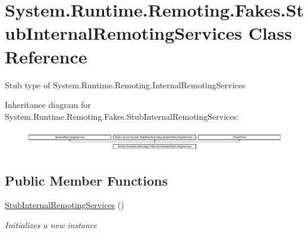 \hypertarget{class_system_1_1_runtime_1_1_remoting_1_1_fakes_1_1_stub_internal_remoting_services}{\section{System.\-Runtime.\-Remoting.\-Fakes.\-Stub\-Internal\-Remoting\-Services Class Reference}
\label{class_system_1_1_runtime_1_1_remoting_1_1_fakes_1_1_stub_internal_remoting_services}
}


Stub type of System.\-Runtime.\-Remoting.\-Internal\-Remoting\-Services 


Inheritance diagram for System.\-Runtime.\-Remoting.\-Fakes.\-Stub\-Internal\-Remoting\-Services\-:\begin{figure}[H]
\begin{center}
\leavevmode
\includegraphics[height=0.933333cm]{class_system_1_1_runtime_1_1_remoting_1_1_fakes_1_1_stub_internal_remoting_services}
\end{center}
\end{figure}
\subsection*{Public Member Functions}
\begin{DoxyCompactItemize}
\item 
\hyperlink{class_system_1_1_runtime_1_1_remoting_1_1_fakes_1_1_stub_internal_remoting_services_a28d671835f2a3e1f556bc4d48d4d8ea2}{Stub\-Internal\-Remoting\-Services} ()
\begin{DoxyCompactList}\small\item\em Initializes a new instance\end{DoxyCompactList}\end{DoxyCompactItemize}
